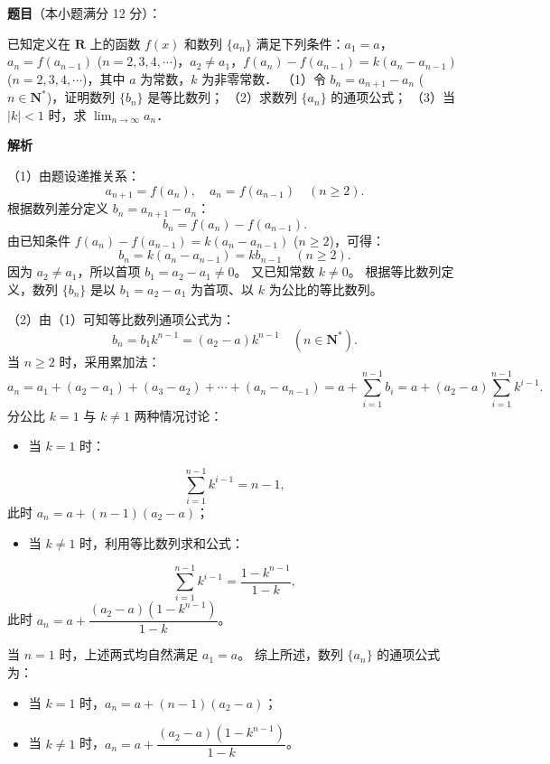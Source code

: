 \begin{answer}

\textbf{题目}（本小题满分 12 分）：

已知定义在 $\mathbf{R}$ 上的函数 $f(x)$ 和数列 $\{a_n\}$ 满足下列条件：$a_1 = a$，$a_n = f(a_{n-1})$ ($n = 2, 3, 4, \cdots$)，$a_2 \ne a_1$，$f(a_n) - f(a_{n-1}) = k(a_n - a_{n-1})$ ($n = 2, 3, 4, \cdots$)，其中 $a$ 为常数，$k$ 为非零常数．
（1）令 $b_n = a_{n+1} - a_n$ ($n \in \mathbf{N}^*$)，证明数列 $\{b_n\}$ 是等比数列；
（2）求数列 $\{a_n\}$ 的通项公式；
（3）当 $|k| < 1$ 时，求 $\lim_{n \to \infty} a_n$．

\textbf{解析}

（1）由题设递推关系：
\nopagebreak[4]
\[
a_{n+1} = f(a_n), \quad a_n = f(a_{n-1}) \quad (n \ge 2).
\]
根据数列差分定义 $b_n = a_{n+1} - a_n$：
\nopagebreak[4]
\[
b_n = f(a_n) - f(a_{n-1}).
\]
由已知条件 $f(a_n) - f(a_{n-1}) = k(a_n - a_{n-1})$ ($n \ge 2$)，可得：
\nopagebreak[4]
\[
b_n = k(a_n - a_{n-1}) = k b_{n-1} \quad (n \ge 2).
\]
因为 $a_2 \neq a_1$，所以首项 $b_1 = a_2 - a_1 \neq 0$。
又已知常数 $k \neq 0$。
根据等比数列定义，数列 $\{b_n\}$ 是以 $b_1 = a_2 - a_1$ 为首项、以 $k$ 为公比的等比数列。

（2）由（1）可知等比数列通项公式为：
\nopagebreak[4]
\[
b_n = b_1 k^{n-1} = (a_2 - a) k^{n-1} \quad (n \in \mathbf{N}^*).
\]
当 $n \ge 2$ 时，采用累加法：
\nopagebreak[4]
\[
a_n = a_1 + (a_2 - a_1) + (a_3 - a_2) + \cdots + (a_n - a_{n-1}) = a + \sum_{i=1}^{n-1} b_i = a + (a_2 - a)\sum_{i=1}^{n-1} k^{i-1}.
\]
分公比 $k = 1$ 与 $k \neq 1$ 两种情况讨论：
\begin{itemize}
\item 当 $k = 1$ 时：
\end{itemize}
\nopagebreak[4]
\[
\sum_{i=1}^{n-1} k^{i-1} = n - 1,
\]
  此时 $a_n = a + (n - 1)(a_2 - a)$；
\begin{itemize}
\item 当 $k \neq 1$ 时，利用等比数列求和公式：
\end{itemize}
\nopagebreak[4]
\[
\sum_{i=1}^{n-1} k^{i-1} = \dfrac{1 - k^{n-1}}{1 - k},
\]
  此时 $a_n = a + \dfrac{(a_2 - a)(1 - k^{n-1})}{1 - k}$。

当 $n = 1$ 时，上述两式均自然满足 $a_1 = a$。
综上所述，数列 $\{a_n\}$ 的通项公式为：
\begin{itemize}
\item 当 $k = 1$ 时，$a_n = a + (n - 1)(a_2 - a)$；
\item 当 $k \neq 1$ 时，$a_n = a + \dfrac{(a_2 - a)(1 - k^{n-1})}{1 - k}$。
\end{itemize}


\end{answer}
